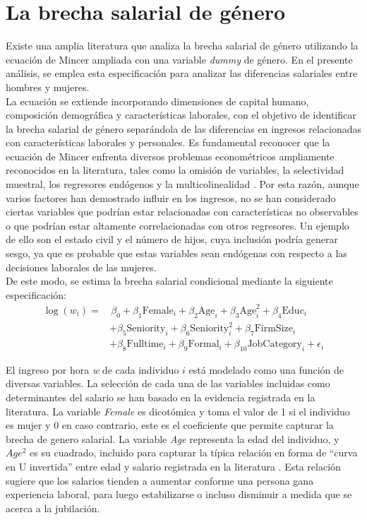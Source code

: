 \documentclass[12pt,a4paper,onecolumn]{article}
\begin{document}
\section{La brecha salarial de género}
Existe una amplia literatura que analiza la brecha salarial de género utilizando la ecuación de Mincer ampliada con una variable \textit{dummy} de género. En el presente análisis, se emplea esta especificación para analizar las diferencias salariales entre hombres y mujeres. \\
\bigbreak
La ecuación se extiende incorporando dimensiones de capital humano, composición demográfica y características laborales, con el objetivo de identificar la brecha salarial de género separándola de las diferencias en ingresos relacionadas con características laborales y personales. Es fundamental reconocer que la ecuación de Mincer enfrenta diversos problemas econométricos ampliamente reconocidos en la literatura, tales como la omisión de variables, la selectividad muestral, los regresores endógenos y la multicolinealidad \citep{polachek2007}. Por esta razón, aunque varios factores han demostrado influir en los ingresos, no se han considerado ciertas variables que podrían estar relacionadas con características no observables o que podrían estar altamente correlacionadas con otros regresores. Un ejemplo de ello son el estado civil y el número de hijos, cuya inclusión podría generar sesgo, ya que es probable que estas variables sean endógenas con respecto a las decisiones laborales de las mujeres. \\

De este modo, se estima la brecha salarial condicional mediante la siguiente especificación:
\begin{align}
\label{eq:mincer}
\log(w_{i}) = & \, \beta_0 + \beta_1  \text{Female}_i + \beta_2 \text{Age}_i + \beta_3  \text{Age}^2_i + \beta_4  \text{Educ}_i \nonumber \\
& + \beta_5  \text{Seniority}_i   + \beta_6  \text{Seniority}^2_i + \beta_7 \text{FirmSize}_i \nonumber \\ 
& + \beta_8 \text{Fulltime}_i + \beta_9 \text{Formal}_i  +  \beta_{10} \text{JobCategory}_i  +  \epsilon_i
\end{align}


El ingreso por hora \textit{w} de cada individuo $i$ está modelado como una función de diversas variables. La selección de cada una de las variables incluidas como determinantes del salario se han basado en la evidencia registrada en la literatura. La variable \textit{Female} es dicotómica y toma el valor de 1 si el individuo es mujer y 0 en caso contrario, este es el coeficiente que permite capturar la brecha de genero salarial. La variable \textit{Age} representa la edad del individuo, y $Age^2$ es su cuadrado, incluido para capturar la típica relación en forma de ``curva en U invertida'' entre edad y salario registrada en la literatura \citep{varela2010}. Esta relación sugiere que los salarios tienden a aumentar conforme una persona gana experiencia laboral, para luego estabilizarse o incluso disminuir a medida que se acerca a la jubilación. \\
\end{document}
